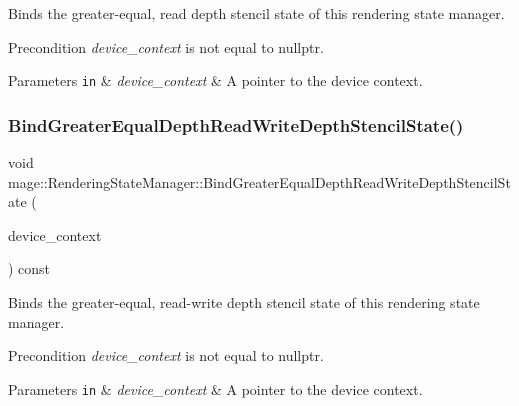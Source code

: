 Binds the greater-\/equal, read depth stencil state of this rendering state manager.

\begin{DoxyPrecond}{Precondition}
{\itshape device\+\_\+context} is not equal to {\ttfamily nullptr}. 
\end{DoxyPrecond}

\begin{DoxyParams}[1]{Parameters}
\mbox{\tt in}  & {\em device\+\_\+context} & A pointer to the device context. \\
\hline
\end{DoxyParams}
\hypertarget{classmage_1_1_rendering_state_manager_acaff9c2ced6147953c9f66a859238dc1}{}\label{classmage_1_1_rendering_state_manager_acaff9c2ced6147953c9f66a859238dc1} 
\subsubsection{\texorpdfstring{Bind\+Greater\+Equal\+Depth\+Read\+Write\+Depth\+Stencil\+State()}{BindGreaterEqualDepthReadWriteDepthStencilState()}}
{\footnotesize\ttfamily void mage\+::\+Rendering\+State\+Manager\+::\+Bind\+Greater\+Equal\+Depth\+Read\+Write\+Depth\+Stencil\+State (\begin{DoxyParamCaption}\item[{I\+D3\+D11\+Device\+Context4 $\ast$}]{device\+\_\+context }\end{DoxyParamCaption}) const\hspace{0.3cm}{\ttfamily [noexcept]}}

Binds the greater-\/equal, read-\/write depth stencil state of this rendering state manager.

\begin{DoxyPrecond}{Precondition}
{\itshape device\+\_\+context} is not equal to {\ttfamily nullptr}. 
\end{DoxyPrecond}

\begin{DoxyParams}[1]{Parameters}
\mbox{\tt in}  & {\em device\+\_\+context} & A pointer to the device context. \\
\hline
\end{DoxyParams}
\hypertarget{classmage_1_1_rendering_state_manager_a9970652cbdd9ce2b1209d25026f77edd}{}\label{classmage_1_1_rendering_state_manager_a9970652cbdd9ce2b1209d25026f77edd} 
